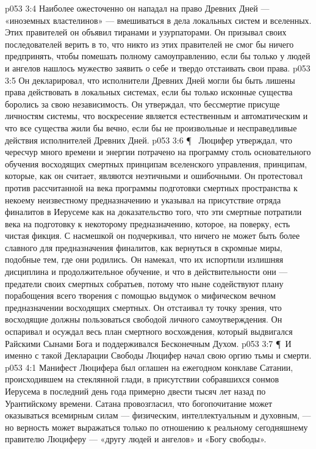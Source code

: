 \vs p053 3:4 Наиболее ожесточенно он нападал на право Древних Дней --- «иноземных властелинов» --- вмешиваться в дела локальных систем и вселенных. Этих правителей он объявил тиранами и узурпаторами. Он призывал своих последователей верить в то, что никто из этих правителей не смог бы ничего предпринять, чтобы помешать полному самоуправлению, если бы только у людей и ангелов нашлось мужество заявить о себе и твердо отстаивать свои права.
\vs p053 3:5 Он декларировал, что исполнители Древних Дней могли бы быть лишены права действовать в локальных системах, если бы только исконные существа боролись за свою независимость. Он утверждал, что бессмертие присуще личностям системы, что воскресение является естественным и автоматическим и что все существа жили бы вечно, если бы не произвольные и несправедливые действия исполнителей Древних Дней.
\vs p053 3:6 \P\ \bibnobreakspace {} Люцифер утверждал, что чересчур много времени и энергии потрачено на программу столь основательного обучения восходящих смертных принципам вселенского управления, принципам, которые, как он считает, являются неэтичными и ошибочными. Он протестовал против рассчитанной на века программы подготовки смертных пространства к некоему неизвестному предназначению и указывал на присутствие отряда финалитов в Иерусеме как на доказательство того, что эти смертные потратили века на подготовку к некоторому предназначению, которое, на поверку, есть чистая фикция. С насмешкой он подчеркивал, что ничего не может быть более славного для предназначения финалитов, как вернуться в скромные миры, подобные тем, где они родились. Он намекал, что их испортили излишняя дисциплина и продолжительное обучение, и что в действительности они --- предатели своих смертных собратьев, потому что ныне содействуют плану порабощения всего творения с помощью выдумок о мифическом вечном предназначении восходящих смертных. Он отстаивал ту точку зрения, что восходящие должны пользоваться свободой личного самоутверждения. Он оспаривал и осуждал весь план смертного восхождения, который выдвигался Райскими Сынами Бога и поддерживался Бесконечным Духом.
\vs p053 3:7 \P\ И именно с такой Декларации Свободы Люцифер начал свою оргию тьмы и смерти.
\vs p053 4:1 Манифест Люцифера был оглашен на ежегодном конклаве Сатании, происходившем на стеклянной глади, в присутствии собравшихся сонмов Иерусема в последний день года примерно двести тысяч лет назад по Урантийскому времени. Сатана провозгласил, что богопочитание может оказываться всемирным силам --- физическим, интеллектуальным и духовным, --- но верность может выражаться только по отношению к реальному сегодняшнему правителю Люциферу --- «другу людей и ангелов» и «Богу свободы».
